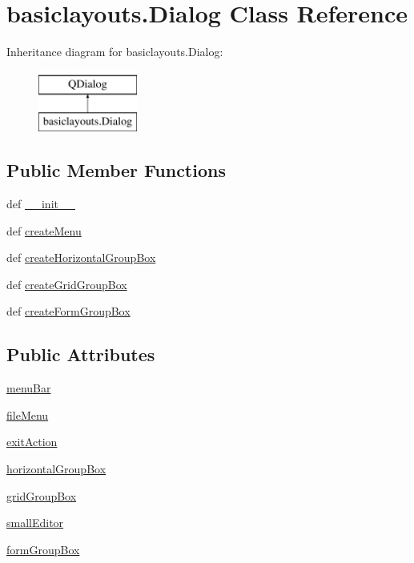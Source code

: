 \hypertarget{classbasiclayouts_1_1Dialog}{}\section{basiclayouts.\+Dialog Class Reference}
\label{classbasiclayouts_1_1Dialog}
Inheritance diagram for basiclayouts.\+Dialog\+:\begin{figure}[H]
\begin{center}
\leavevmode
\includegraphics[height=2.000000cm]{classbasiclayouts_1_1Dialog}
\end{center}
\end{figure}
\subsection*{Public Member Functions}
\begin{DoxyCompactItemize}
\item 
def \hyperlink{classbasiclayouts_1_1Dialog_a14c52fc996cc4f27e6ed8dc89b3462c1}{\+\_\+\+\_\+init\+\_\+\+\_\+}
\item 
def \hyperlink{classbasiclayouts_1_1Dialog_ae454881fa132a033400d7f25f694fe31}{create\+Menu}
\item 
def \hyperlink{classbasiclayouts_1_1Dialog_aaf8b8b4640034c03783d591cc13bbd1b}{create\+Horizontal\+Group\+Box}
\item 
def \hyperlink{classbasiclayouts_1_1Dialog_a4a9b1a5b9cbc6cbcb8c949458a29f4ca}{create\+Grid\+Group\+Box}
\item 
def \hyperlink{classbasiclayouts_1_1Dialog_a4f298e4153b9496fc1ca5446b51aceb6}{create\+Form\+Group\+Box}
\end{DoxyCompactItemize}
\subsection*{Public Attributes}
\begin{DoxyCompactItemize}
\item 
\hyperlink{classbasiclayouts_1_1Dialog_a4d1ef7d8afd68a21c8eab6c9790191eb}{menu\+Bar}
\item 
\hyperlink{classbasiclayouts_1_1Dialog_a1183a6f4d9d0c694698d227b5e093b6a}{file\+Menu}
\item 
\hyperlink{classbasiclayouts_1_1Dialog_af69969df335f9eeb3309ce7f3c1f9a72}{exit\+Action}
\item 
\hyperlink{classbasiclayouts_1_1Dialog_a4c43e89c83f471e872992bb122c44ba5}{horizontal\+Group\+Box}
\item 
\hyperlink{classbasiclayouts_1_1Dialog_a98b3027b0d013463db69fbf05b998b08}{grid\+Group\+Box}
\item 
\hyperlink{classbasiclayouts_1_1Dialog_a308137f8192349a6c72d27ac34ee8c83}{small\+Editor}
\item 
\hyperlink{classbasiclayouts_1_1Dialog_a7688641996773f76f8717cafe972995a}{form\+Group\+Box}
\end{DoxyCompactItemize}

